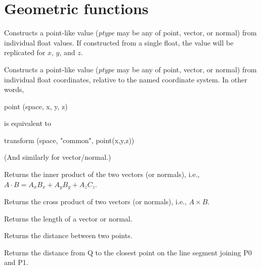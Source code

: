 \documentclass[11pt,letterpaper]{book}
\def\float{{\cf float}\xspace}
\def\normal{{\cf normal}\xspace}
\def\point{{\cf point}\xspace}
\def\vector{{\cf vector}\xspace}
\begin{document}
\section{Geometric functions}
\label{sec:stdlib:geom}


Constructs a point-like value (\emph{ptype} may be any of \point,
\vector, or \normal) from individual \float values.  If constructed
from a single \float, the value will be replicated for $x$, $y$, and $z$.

\apiend

  
Constructs a point-like value (\emph{ptype} may be any of \point,
\vector, or \normal) from individual \float coordinates, relative
to the named coordinate system.  In other words,
\begin{code}
    point (space, x, y, z)
\end{code}
\noindent is equivalent to
\begin{code}
    transform (space, "common", point(x,y,z))
\end{code}
(And similarly for \vector/\normal.)
\apiend

Returns the inner product of the two vectors (or normals), i.e., 
$A \cdot B = A_x B_x + A_y B_y + A_z C_z$.
\apiend

Returns the cross product of two vectors (or normals), i.e., 
$A \times B$.
\apiend

Returns the length of a vector or normal.
\apiend

Returns the distance between two points.
\apiend

Returns the distance from {\cf Q} to the closest point on the line
segment joining {\cf P0} and {\cf P1}.
\end{document}
